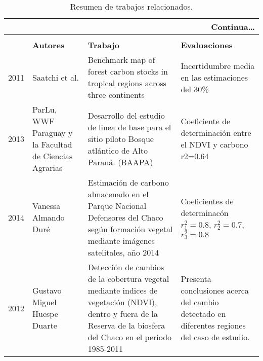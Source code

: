 	\begin{longtable}{|p{3cm}|p{3cm}|p{3cm}|p{3cm}|}



		 \hline
		 \endhead
		 \hline
		 \multicolumn{4}{|r|}{{Continua\ldots}} \\

		 \hline
		 \endfoot
		 
		 \hline 
		 		 		\caption{Resumen de trabajos relacionados.} \label{t:resumenrelacionado} \\
		 \endlastfoot
		 
\multicolumn{1}{|l|}{{\bf A\~{n}o}} & \multicolumn{1}{l|}{{\bf Autores}}                                                                                                                                            & \multicolumn{1}{l|}{{\bf Trabajo}} & \multicolumn{1}{l|}{{\bf Evaluaciones}} \\ \hline
		2011          & Saatchi et al.                                         & Benchmark map of forest carbon stocks in tropical regions across three continents                                                                                      & Incertidumbre media en las estimaciones del 30\%                                          \\ \hline
		2013          & ParLu, WWF Paraguay y la Facultad de Ciencias Agrarias & Desarrollo del estudio de linea de base para el sitio piloto Bosque atl\'antico de Alto Paran\'a. (BAAPA)                                                               & Coeficiente de determinaci\'on entre el NDVI y carbono r2=0.64                              \\ \hline
		2014           & Vanessa Almando Dur\'e                                 & Estimaci\'on de carbono almacenado en el Parque Nacional Defensores del Chaco seg\'un formaci\'on vegetal mediante im\'agenes satelitales, a\~{n}o 2014              & Coeficientes de determinac\'on $ r_{1}^{2}=0.8$, $ r_{2}^{2}=0.7 $, $r_{3}^{2}=0.8 $      \\ \hline
		2012          & Gustavo Miguel Huespe Duarte                           & Detecci\'on de cambios de la cobertura vegetal mediante indices de vegetaci\'on (NDVI), dentro y fuera de la Reserva de la biosfera del Chaco en el periodo 1985-2011  & Presenta conclusiones acerca del cambio detectado en diferentes regiones del caso de estudio.                                                                               \\ \hline

\end{longtable}
